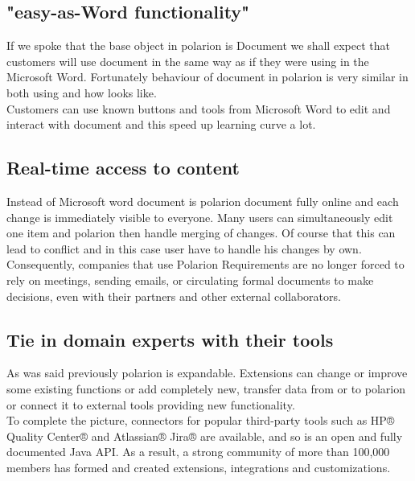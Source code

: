 \documentclass[thesis=M,english]{FITthesis}[2012/06/26]
\begin{document}
\subsection{"easy-as-Word functionality"}

If we spoke that the base object in \acrshort{polarion} is Document we shall expect that customers will use document in the same way as if they were using in the Microsoft Word. Fortunately behaviour of document in \acrshort{polarion} is very similar in both using and how looks like.\\

Customers can use known buttons and tools from Microsoft Word to edit and interact with document and this speed up learning curve a lot. 

\subsection{Real-time access to content}

Instead of Microsoft word document is \acrshort{polarion} document fully online and each change is immediately visible to everyone. Many users can simultaneously edit one item and \acrshort{polarion} then handle merging of changes. Of course that this can lead to conflict and in this case user have to handle his changes by own.\\ 

Consequently, companies that use Polarion Requirements are no longer forced to rely on meetings, sending emails, or circulating formal documents to make decisions, even with their partners and other external collaborators.

\subsection{Tie in domain experts with their tools}

As was said previously \acrshort{polarion} is expandable. Extensions can change or improve some existing functions or add completely new, transfer data from or to \acrshort{polarion} or connect it to external tools providing new functionality.\\

To complete the picture, connectors for popular third-party tools such as HP® Quality Center® and Atlassian® Jira® are available, and so is an open and fully documented Java API. As a result, a strong community of more than 100,000 members has formed and created extensions, integrations and customizations.
\end{document}
